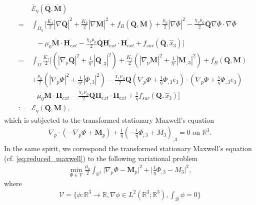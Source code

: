 \documentclass{article}
\def\Qvec{\mathbf{Q}}
\def \Mvec{\mathbf{M}}
\def\Hvec{\mathbf{H}}
\begin{document}
\begin{eqnarray}
& &\mathcal{\overline{E}}_{\eta}\left(\overline{\Qvec}, \overline{\Mvec}\right)\nonumber\\
&=&\int_{\Omega_{\eta}}\biggl[\frac{K_1}{2}|\nabla\overline{\Qvec}|^2+\frac{K_2}{2}|\nabla\overline{\Mvec}|^2+f_B\left(\overline{\Qvec}, \overline{\Mvec}\right)+\frac{\mu_0}{2}|\nabla\overline{\Phi}|^2- \frac{\chi_1\mu_0}{2}\overline{\Qvec}\nabla\overline{\Phi}\cdot\nabla\overline{\Phi}\nonumber\\
& &\nonumber\\
& &~~~-\mu_0\overline{\Mvec}\cdot\overline{\Hvec_{ext}} - \frac{\chi_1\mu_0}{2}\overline{\Qvec}\overline{\Hvec_{ext}}\cdot\overline{\Hvec_{ext}}+f_{sur}\left(\overline{\Qvec}, \hat{x}_3\right)\biggr]\nonumber\\
&=&\int_{\Omega}\frac{K_1}{2}\biggl[\left(|\nabla_p\Qvec|^2+\frac{1}{\eta^2}|\Qvec_{,3}|^2\right)+\frac{K_2}{2}\left(|\nabla_p\Mvec|^2+\frac{1}{\eta^2}|\Mvec_{,3}|^2\right)+f_B\left(\Qvec, \Mvec\right)\nonumber\\
& &+\frac{\mu_0}{2}\left(|\nabla_p\Phi|^2+\frac{1}{\eta^2}|\Phi_{,3}|^2\right)- \frac{\chi_1\mu_0}{2}\Qvec\left(\nabla_p\Phi+\frac{1}{\eta}\Phi_{,3}e_3\right)\cdot\left(\nabla_p\Phi+\frac{1}{\eta}\Phi_{,3}e_3\right)\nonumber\\
& & -\mu_0\Mvec\cdot\Hvec_{ext} - \frac{\chi_1\mu_0}{2}\Qvec\Hvec_{ext}\cdot\Hvec_{ext}+\frac{1}{\eta}f_{sur}\left(\Qvec, \hat{x}_3\right)\biggr]\nonumber\\
&:=& \mathcal{E}_{\eta}\left(\Qvec, \Mvec\right),\label{eq:energy_reduced}
\end{eqnarray}
which is subjected to the transformed stationary Maxwell's equation
\begin{eqnarray}
\nabla_p\cdot\left(-\nabla_p\Phi+\Mvec_p\right)+\frac{1}{\eta}\left(-\frac{1}{\eta}\Phi_{,3}+M_3\right)_{,3}=0 \mbox{ on } \mathbb R^3.\label{eq:reduced_maxwell}
\end{eqnarray}
In the same spirit, we correspond the transformed stationary Maxwell's equation (cf. \eqref{eq:reduced_maxwell}) to the following variational problem
\begin{eqnarray}
\min_{\Phi\in \mathcal{V}}\frac{\mu_0}{2}\int_{\mathbb R^3}\bigg|\nabla_p\Phi-\Mvec_p\bigg|^2 + \bigg|\frac{1}{\eta}\Phi_{,3}-M_3\bigg|^2,\label{stray_minimization}
\end{eqnarray}
where
\begin{eqnarray}
\mathcal{V}=\bigg\{\phi:\mathbb R^3\rightarrow\mathbb R, \nabla\phi\in L^2\left(\mathbb R^3; \mathbb R^3\right), \int_{\mathcal{B}}\phi=0\bigg\}
\end{eqnarray}
\end{document}
